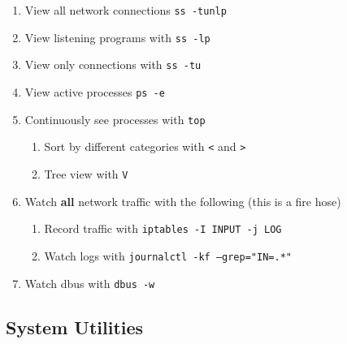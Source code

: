 \documentclass[12pt,letterpaper]{article}
\def\code#1{\textcolor{c2}{\texttt{#1}}}
\def\bf#1{\textbf{#1}}
\begin{document}
\begin{enumerate}
	\item View all network connections \code{ss -tunlp}
	\item View listening programs with \code{ss -lp}
	\item View only connections with \code{ss -tu}
	\item View active processes \code{ps -e}
	\item Continuously see processes with \code{top}
		\begin{enumerate}
			\item Sort by different categories with \code{<} and \code{>}
			\item Tree view with \code{V}
		\end{enumerate}
	\item Watch \bf{all} network traffic with the following (this is a fire hose)
		\begin{enumerate}
			\item Record traffic with \code{iptables -I INPUT -j LOG}
			\item Watch logs with \code{journalctl -kf --grep="IN=.*"}
		\end{enumerate}
	\item Watch dbus with \code{dbus -w}
\end{enumerate}

\subsection{System Utilities}
\end{document}
